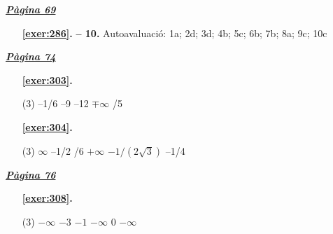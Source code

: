 
\hyperlink{page.69}{\textbf{\em Pàgina 69}}
\begin{enumerate}
\item[\fontfamily{phv}\selectfont\color{blue}\textbf{\ref{exer:286}. }] \label{ans:286} 
\textbf {-- 10.} Autoavaluació: 1a; 2d; 3d; 4b; 5c; 6b; 7b; 8a; 9c; 10c
 \end{enumerate}

 \vspace{1cm} 
 

\vspace{0.3cm}


\hyperlink{page.74}{\textbf{\em Pàgina 74}}
\begin{enumerate}



 \item[\fontfamily{phv}\selectfont\color{blue}\textbf{\ref{exer:303}. }] \label{ans:303}
 \begin{tasks}[column-sep=1em, item-indent=1.3333em](3)
	 \task --1/6
	 \task --9
	 \task --12
	 \task $\mp \infty $
	 /5
\end{tasks}
 \end{enumerate}
\begin{enumerate}



 \item[\fontfamily{phv}\selectfont\color{blue}\textbf{\ref{exer:304}. }] \label{ans:304}
 \begin{tasks}[column-sep=1em, item-indent=1.3333em](3)
	 \task $\infty $
	 \task --1/2
	 /6
	 \task $+\infty $
	 \task $-1/(2\sqrt {3})$
	 \task --1/4
\end{tasks}
 \end{enumerate}
\vspace{0.3cm}


\hyperlink{page.76}{\textbf{\em Pàgina 76}}
\begin{enumerate}



 \item[\fontfamily{phv}\selectfont\color{blue}\textbf{\ref{exer:308}. }] \label{ans:308}
 \begin{tasks}[column-sep=1em, item-indent=1.3333em](3)
	 \task $-\infty $
	 \task $-3$
	 \task $-1$
	 \task $-\infty $
	 \task $0$
	 \task $-\infty $
\end{tasks}
 \end{enumerate}
\vspace{0.3cm}

